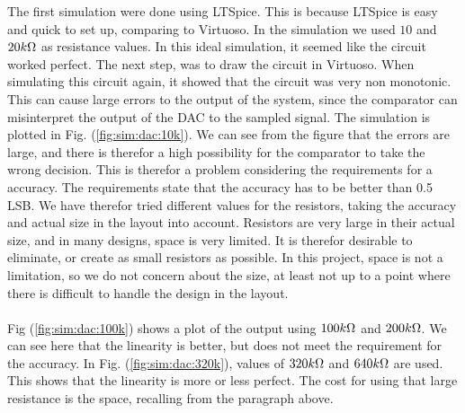 \documentclass[english, 12pt, a4paper]{ifimaster}
\begin{document}
\newline
The first simulation were done using LTSpice. This is because LTSpice is easy and quick to set up, comparing to Virtuoso. In the simulation we used \(10\) and \(20 k\ohm\) as resistance values. 
In this ideal simulation, it seemed like the circuit worked perfect. The next step, was to draw the circuit in Virtuoso. When simulating this circuit again, it showed that the circuit 
was very non monotonic. This can cause large errors to the output of the system, since the comparator can misinterpret the output of the DAC to the sampled signal. The simulation is plotted in 
Fig. (\ref{fig:sim:dac:10k}). We can see from the figure that the errors are large, and there is therefor a high possibility for the comparator to take the wrong decision. This is therefor a problem
considering the requirements for a accuracy. The requirements state that the accuracy has to be better than 0.5 LSB. We have therefor tried different values for the resistors, taking the accuracy and 
actual size in the layout into account. Resistors are very large in their actual size, and in many designs, space is very limited. It is therefor desirable to eliminate, or create as small resistors 
as possible. In this project, space is not a limitation, so we do not concern about the size, at least not up to a point where there is difficult to handle the design in the layout. \\
\\
Fig (\ref{fig:sim:dac:100k}) shows a plot of the output using \(100 k\ohm\) and \(200 k\ohm\). We can see here that the linearity is better, but does not meet the requirement for the accuracy. In 
Fig. (\ref{fig:sim:dac:320k}), values of \(320 k\ohm\) and \(640 k\ohm\) are used. This shows that the linearity is more or less perfect. The cost for using that large resistance is the space, 
recalling from the paragraph above.  
\end{document}
